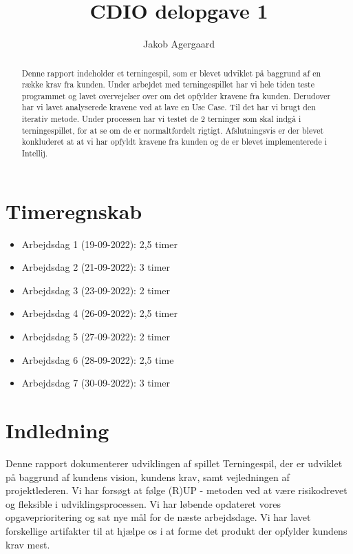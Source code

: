 \documentclass{article}
\title{CDIO delopgave 1}
\author{Jakob Agergaard}
\begin{document}


\normalsize
\begin{abstract}
     Denne rapport indeholder et terningespil, som er blevet udviklet på baggrund af en række krav fra kunden. Under arbejdet med terningespillet har vi hele tiden teste programmet og lavet overvejelser over om det opfylder kravene fra kunden. Derudover har vi lavet analyserede kravene ved at lave en Use Case.  Til det har vi brugt den iterativ metode. Under processen har vi testet de 2 terninger som skal indgå i terningespillet, for at se om de er normaltfordelt rigtigt. Afslutningsvis er der blevet konkluderet at at vi har opfyldt kravene fra kunden og de er blevet implementerede i Intellij.     
\end{abstract}
\break

\tableofcontents

\break

\section{Timeregnskab}
\begin{itemize}
\item
Arbejdsdag 1 (19-09-2022): 2,5 timer
\item
Arbejdsdag 2 (21-09-2022): 3 timer
\item
Arbejdsdag 3 (23-09-2022): 2 timer
\item
Arbejdsdag 4 (26-09-2022): 2,5 timer
\item
Arbejdsdag 5 (27-09-2022): 2 timer
\item
Arbejdsdag 6 (28-09-2022): 2,5 time
\item
Arbejdsdag 7 (30-09-2022): 3 timer
\end{itemize}

\section{Indledning}

Denne rapport dokumenterer udviklingen af spillet Terningespil, der er udviklet på baggrund af kundens vision, kundens krav, samt vejledningen af projektlederen. Vi har forsøgt at følge (R)UP - metoden ved at være risikodrevet og fleksible i udviklingsprocessen. Vi har løbende opdateret vores opgaveprioritering og sat nye mål for de næste arbejdsdage. Vi har lavet forskellige artifakter til at hjælpe os i at forme det produkt der opfylder kundens krav mest. 
\end{document}
